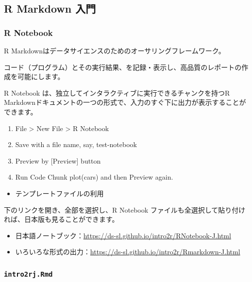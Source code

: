 \documentclass[
]{article}
\providecommand{\tightlist}{%
  \setlength{\itemsep}{0pt}\setlength{\parskip}{0pt}}
\begin{document}
\hypertarget{r-markdown-ux5165ux9580}{%
\subsection{R Markdown 入門}\label{r-markdown-ux5165ux9580}}

\hypertarget{r-notebook}{%
\subsubsection{R Notebook}\label{r-notebook}}

R Markdownはデータサイエンスのためのオーサリングフレームワーク。

コード（プログラム）とその実行結果、を記録・表示し、高品質のレポートの作成を可能にします。

R Notebook は、独立してインタラクティブに実行できるチャンクを持つR
Markdownドキュメントの一つの形式で、入力のすぐ下に出力が表示することができます。

\begin{enumerate}
\def\labelenumi{\arabic{enumi}.}
\tightlist
\item
  File \textgreater{} New File \textgreater{} R Notebook
\item
  Save with a file name, say, test-notebook
\item
  Preview by {[}Preview{]} button
\item
  Run Code Chunk plot(cars) and then Preview again.
\end{enumerate}

\begin{itemize}
\tightlist
\item
  テンプレートファイルの利用
\end{itemize}

下のリンクを開き、全部を選択し、R Notebook
ファイルも全選択して貼り付ければ、日本版も見ることができます。

\begin{itemize}
\tightlist
\item
  日本語ノートブック：\url{https://ds-sl.github.io/intro2r/RNotebook-J.html}
\item
  いろいろな形式の出力：\url{https://ds-sl.github.io/intro2r/Rmarkdown-J.html}
\end{itemize}

\hypertarget{intro2rj.rmd}{%
\subsubsection{\texorpdfstring{\texttt{intro2rj.Rmd}}{intro2rj.Rmd}}\label{intro2rj.rmd}}
\end{document}
